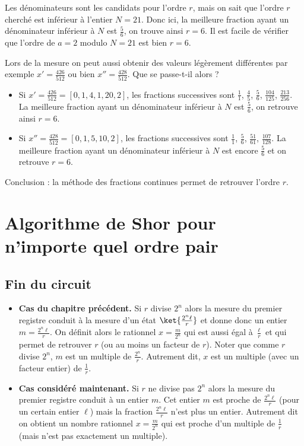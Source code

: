 \documentclass[11pt,class=report,crop=false]{standalone}
\begin{document}
Les dénominateurs sont les candidats pour l'ordre $r$, mais on sait que l'ordre $r$ cherché est inférieur à l'entier $N = 21$. Donc ici, la meilleure fraction ayant un dénominateur inférieur à $N$ est $\frac56$, on trouve ainsi $r=6$.
Il est facile de vérifier que l'ordre de $a=2$ modulo $N=21$ est bien $r=6$.


Lors de la mesure on peut aussi obtenir des valeurs légèrement différentes par exemple $x' = \frac{426}{512}$ ou bien $x'' = \frac{428}{512}$. Que se passe-t-il alors ? 
\begin{itemize}
  \item Si $x' = \frac{426}{512} = [0,1,4,1,20,2]$, les fractions successives sont $\frac11$, $\frac45$, $\frac56$, $\frac{104}{125}$, $\frac{213}{256}$. 
 La meilleure fraction ayant un dénominateur inférieur à $N$ est $\frac56$, on retrouve ainsi $r=6$.
  \item Si $x'' = \frac{428}{512} = [0,1,5,10,2]$, les fractions successives sont $\frac11$, $\frac56$, $\frac{51}{61}$, $\frac{107}{128}$. 
 La meilleure fraction ayant un dénominateur inférieur à $N$ est encore $\frac56$ et on retrouve $r=6$.
\end{itemize}

Conclusion : la méthode des fractions continues permet de retrouver l'ordre $r$.



\section{Algorithme de Shor pour n'importe quel ordre pair}


\subsection{Fin du circuit}


\begin{itemize}
  \item \textbf{Cas du chapitre précédent.} Si $r$ divise $2^n$ alors la mesure du premier registre conduit à la mesure d'un état $\ket{\frac{2^n\ell}{r}}$ et donne donc un entier $m = \frac{2^n\ell}{r}$.  
  On définit alors le rationnel $x = \frac{m}{2^n}$ qui est aussi égal à $\frac{\ell}{r}$ et qui permet de retrouver $r$ (ou au moins un facteur de $r$).   
  Noter que comme $r$ divise $2^n$, $m$ est un multiple de $\frac{2^n}{r}$. Autrement dit, $x$ est un multiple (avec un facteur entier) de $\frac 1r$.

  \item \textbf{Cas considéré maintenant.} Si $r$ ne divise pas $2^n$ alors la mesure du premier registre conduit à un entier $m$. Cet entier $m$ est proche de $\frac{2^n\ell}{r}$ (pour un certain entier $\ell$) mais la fraction $\frac{2^n\ell}{r}$ n'est plus un entier.
  Autrement dit on obtient un nombre rationnel $x = \frac{m}{2^n}$ qui est proche d'un multiple de $\frac1r$ (mais n'est pas exactement un multiple).
\end{itemize}
\end{document}
